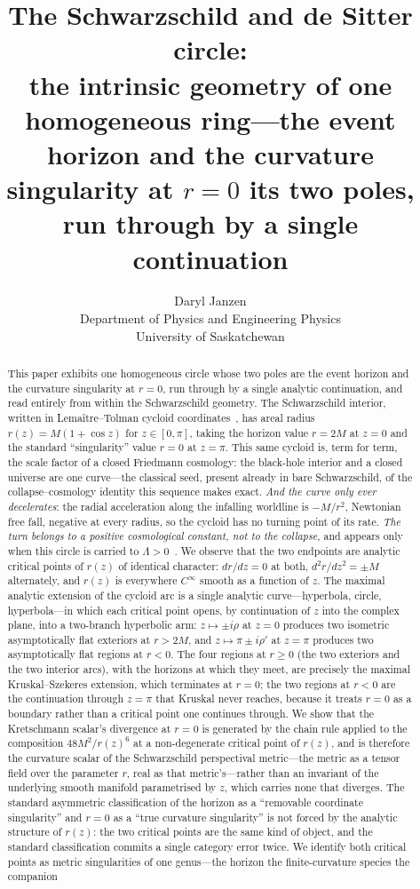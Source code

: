 \documentclass[11pt,a4paper]{article}
\title{The Schwarzschild and de Sitter circle:\\
\large the intrinsic geometry of one homogeneous ring---the event horizon and the curvature singularity at $r=0$ its two poles, run through by a single continuation}
\author{Daryl Janzen\\
\small Department of Physics and Engineering Physics\\
\small University of Saskatchewan}
\date{}
\theoremstyle{definition}
\begin{document}
\maketitle

\begin{abstract}
This paper exhibits one homogeneous circle whose two poles are the event horizon and the curvature singularity at $r=0$, run through by a single analytic continuation, and read entirely from within the Schwarzschild geometry. The Schwarzschild interior, written in Lemaître--Tolman cycloid coordinates~\cite{Tolman1934,Bondi1947}, has areal radius $r(z) = M(1+\cos z)$ for $z \in [0,\pi]$, taking the horizon value $r=2M$ at $z=0$ and the standard ``singularity'' value $r=0$ at $z=\pi$. This same cycloid is, term for term, the scale factor of a closed Friedmann cosmology: the black-hole interior and a closed universe are one curve---the classical seed, present already in bare Schwarzschild, of the collapse--cosmology identity this sequence makes exact. \emph{And the curve only ever decelerates}: the radial acceleration along the infalling worldline is $-M/r^{2}$, Newtonian free fall, negative at every radius, so the cycloid has no turning point of its rate. \emph{The turn belongs to a positive cosmological constant, not to the collapse}, and appears only when this circle is carried to $\Lambda>0$~\cite{JanzenSlicing}. We observe that the two endpoints are analytic critical points of $r(z)$ of identical character: $dr/dz = 0$ at both, $d^2r/dz^2 = \pm M$ alternately, and $r(z)$ is everywhere $C^\infty$ smooth as a function of $z$. The maximal analytic extension of the cycloid arc is a single analytic curve---hyperbola, circle, hyperbola---in which each critical point opens, by continuation of $z$ into the complex plane, into a two-branch hyperbolic arm: $z \mapsto \pm i\rho$ at $z=0$ produces two isometric asymptotically flat exteriors at $r>2M$, and $z \mapsto \pi \pm i\rho'$ at $z=\pi$ produces two asymptotically flat regions at $r<0$. The four regions at $r \geq 0$ (the two exteriors and the two interior arcs), with the horizons at which they meet, are precisely the maximal Kruskal--Szekeres extension, which terminates at $r=0$; the two regions at $r<0$ are the continuation through $z=\pi$ that Kruskal never reaches, because it treats $r=0$ as a boundary rather than a critical point one continues through. We show that the Kretschmann scalar's divergence at $r=0$ is generated by the chain rule applied to the composition $48M^2/r(z)^6$ at a non-degenerate critical point of $r(z)$, and is therefore the curvature scalar of the Schwarzschild perspectival metric---the metric as a tensor field over the parameter $r$, real as that metric's---rather than an invariant of the underlying smooth manifold parametrised by $z$, which carries none that diverges. The standard asymmetric classification of the horizon as a ``removable coordinate singularity'' and $r=0$ as a ``true curvature singularity'' is not forced by the analytic structure of $r(z)$: the two critical points are the same kind of object, and the standard classification commits a single category error twice. We identify both critical points as metric singularities of one genus---the horizon the finite-curvature species the companion 
\end{abstract}
\end{document}
